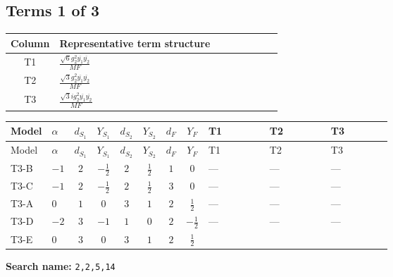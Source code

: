 \documentclass[8pt]{article}
\begin{document}
\begin{landscape}
\subsection*{Terms 1 of 3}
\begin{center}
\begin{tabular}{@{}c >{\raggedright\arraybackslash}p{0.82\linewidth}@{}}
\toprule
Column & Representative term structure \\
\midrule
T1 & \(\displaystyle \frac{\sqrt{6} g_{2}^{2} \overline{y_{1}} \overline{y_{2}}}{MF}\) \\
\midrule
T2 & \(\displaystyle \frac{\sqrt{3} g_{2}^{2} \overline{y_{1}} \overline{y_{2}}}{MF}\) \\
\midrule
T3 & \(\displaystyle \frac{\sqrt{3} i g_{2}^{2} \overline{y_{1}} \overline{y_{2}}}{MF}\) \\
\midrule
\bottomrule
\end{tabular}
\end{center}
\smallskip
\tiny
\begin{longtable}{@{}llcccccc >{\raggedright\arraybackslash}p{0.21\linewidth} >{\raggedright\arraybackslash}p{0.21\linewidth} >{\raggedright\arraybackslash}p{0.21\linewidth}@{}}
\toprule
Model & $\alpha$ & $d_{S_1}$ & $Y_{S_1}$ & $d_{S_2}$ & $Y_{S_2}$ & $d_F$ & $Y_F$ & T1 & T2 & T3 \\
\midrule
\endfirsthead
\toprule
Model & $\alpha$ & $d_{S_1}$ & $Y_{S_1}$ & $d_{S_2}$ & $Y_{S_2}$ & $d_F$ & $Y_F$ & T1 & T2 & T3 \\
\midrule
\endhead
T3-B & $-1$ & $2$ & $-\frac{1}{2}$ & $2$ & $\frac{1}{2}$ & $1$ & $0$ & --- & --- & --- \\
\midrule
T3-C & $-1$ & $2$ & $-\frac{1}{2}$ & $2$ & $\frac{1}{2}$ & $3$ & $0$ & --- & --- & --- \\
\midrule
T3-A & $0$ & $1$ & $0$ & $3$ & $1$ & $2$ & $\frac{1}{2}$ & --- & --- & --- \\
\midrule
T3-D & $-2$ & $3$ & $-1$ & $1$ & $0$ & $2$ & $-\frac{1}{2}$ & --- & --- & --- \\
\midrule
T3-E & $0$ & $3$ & $0$ & $3$ & $1$ & $2$ & $\frac{1}{2}$ & \scriptsize\adjustbox{max width=\linewidth}{$\begin{gathered} - \frac{\sqrt{6} g_{2}^{2} \overline{y_{1}} \overline{y_{2}}}{3 MF}\end{gathered}$} & \scriptsize\adjustbox{max width=\linewidth}{$\begin{gathered} - \frac{\sqrt{3} g_{2}^{2} \overline{y_{1}} \overline{y_{2}}}{6 MF}\end{gathered}$} & \scriptsize\adjustbox{max width=\linewidth}{$\begin{gathered} - \frac{49 \sqrt{3} i g_{2}^{2} \overline{y_{1}} \overline{y_{2}}}{24 MF}\end{gathered}$} \\
\midrule
\bottomrule
\end{longtable}
\clearpage
\noindent\textbf{Search name: }\texttt{2,2,5,14}\par\smallskip

\end{landscape}
\end{document}
